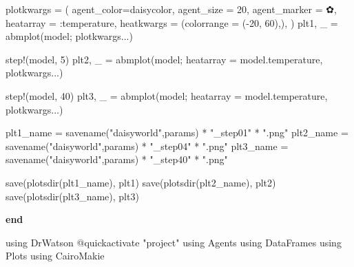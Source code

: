 \documentclass[
  english,
  russian,
  12pt,
  a4paper,
  DIV=11,
  numbers=noendperiod]{scrreprt}
\newenvironment{Shaded}{\begin{snugshade}}{\end{snugshade}}
\newcommand{\BuiltInTok}[1]{\textcolor[rgb]{0.00,0.23,0.31}{#1}}
\newcommand{\CharTok}[1]{\textcolor[rgb]{0.13,0.47,0.30}{#1}}
\newcommand{\ControlFlowTok}[1]{\textcolor[rgb]{0.00,0.23,0.31}{\textbf{#1}}}
\newcommand{\FloatTok}[1]{\textcolor[rgb]{0.68,0.00,0.00}{#1}}
\newcommand{\FunctionTok}[1]{\textcolor[rgb]{0.28,0.35,0.67}{#1}}
\newcommand{\ImportTok}[1]{\textcolor[rgb]{0.00,0.46,0.62}{#1}}
\newcommand{\NormalTok}[1]{\textcolor[rgb]{0.00,0.23,0.31}{#1}}
\newcommand{\OperatorTok}[1]{\textcolor[rgb]{0.37,0.37,0.37}{#1}}
\newcommand{\PreprocessorTok}[1]{\textcolor[rgb]{0.68,0.00,0.00}{#1}}
\newcommand{\StringTok}[1]{\textcolor[rgb]{0.13,0.47,0.30}{#1}}
\begin{document}
\begin{Shaded}
\begin{Highlighting}[]
\NormalTok{    plotkwargs }\OperatorTok{=}\NormalTok{ (}
\NormalTok{        agent\_color}\OperatorTok{=}\NormalTok{daisycolor,}
\NormalTok{        agent\_size }\OperatorTok{=} \FloatTok{20}\NormalTok{,}
\NormalTok{        agent\_marker }\OperatorTok{=} \CharTok{\textquotesingle{}✿\textquotesingle{}}\NormalTok{,}
\NormalTok{        heatarray }\OperatorTok{=} \OperatorTok{:}\NormalTok{temperature,}
\NormalTok{        heatkwargs }\OperatorTok{=}\NormalTok{ (colorrange }\OperatorTok{=}\NormalTok{ (}\OperatorTok{{-}}\FloatTok{20}\NormalTok{, }\FloatTok{60}\NormalTok{),),}
\NormalTok{    )}
\NormalTok{    plt1, \_ }\OperatorTok{=} \FunctionTok{abmplot}\NormalTok{(model; plotkwargs}\OperatorTok{...}\NormalTok{)}

    \FunctionTok{step!}\NormalTok{(model, }\FloatTok{5}\NormalTok{)}
\NormalTok{    plt2, \_ }\OperatorTok{=} \FunctionTok{abmplot}\NormalTok{(model; heatarray }\OperatorTok{=}\NormalTok{ model.temperature, plotkwargs}\OperatorTok{...}\NormalTok{)}

    \FunctionTok{step!}\NormalTok{(model, }\FloatTok{40}\NormalTok{)}
\NormalTok{    plt3, \_ }\OperatorTok{=} \FunctionTok{abmplot}\NormalTok{(model; heatarray }\OperatorTok{=}\NormalTok{ model.temperature, plotkwargs}\OperatorTok{...}\NormalTok{)}

\NormalTok{    plt1\_name }\OperatorTok{=} \FunctionTok{savename}\NormalTok{(}\StringTok{"daisyworld"}\NormalTok{,params) }\OperatorTok{*} \StringTok{"\_step01"} \OperatorTok{*} \StringTok{".png"}
\NormalTok{    plt2\_name }\OperatorTok{=} \FunctionTok{savename}\NormalTok{(}\StringTok{"daisyworld"}\NormalTok{,params) }\OperatorTok{*} \StringTok{"\_step04"} \OperatorTok{*} \StringTok{".png"}
\NormalTok{    plt3\_name }\OperatorTok{=} \FunctionTok{savename}\NormalTok{(}\StringTok{"daisyworld"}\NormalTok{,params) }\OperatorTok{*} \StringTok{"\_step40"} \OperatorTok{*} \StringTok{".png"}

    \FunctionTok{save}\NormalTok{(}\FunctionTok{plotsdir}\NormalTok{(plt1\_name), plt1)}
    \FunctionTok{save}\NormalTok{(}\FunctionTok{plotsdir}\NormalTok{(plt2\_name), plt2)}
    \FunctionTok{save}\NormalTok{(}\FunctionTok{plotsdir}\NormalTok{(plt3\_name), plt3)}

\ControlFlowTok{end}


\ImportTok{using} \BuiltInTok{DrWatson}
\PreprocessorTok{@quickactivate} \StringTok{"project"}
\ImportTok{using} \BuiltInTok{Agents}
\ImportTok{using} \BuiltInTok{DataFrames}
\ImportTok{using} \BuiltInTok{Plots}
\ImportTok{using} \BuiltInTok{CairoMakie}


\end{Highlighting}
\end{Shaded}
\end{document}
